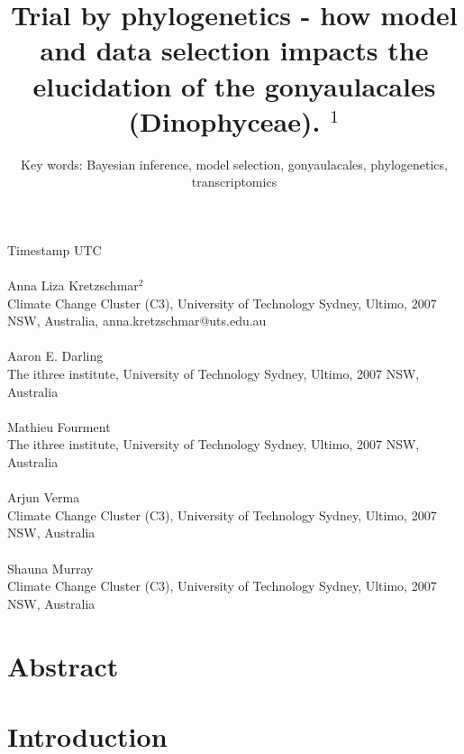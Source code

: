 \documentclass[12pt]{article}
\title{Trial by phylogenetics - how model and data selection impacts the elucidation of the gonyaulacales (Dinophyceae). $^{1}$}
\author{Key words: Bayesian inference, model selection, gonyaulacales, phylogenetics, transcriptomics}
\date{}
\begin{document}
\maketitle

Timestamp \DTMnow UTC

\paragraph{}Anna Liza Kretzschmar$^{2}$\\
Climate Change Cluster (C3), University of Technology Sydney, Ultimo, 2007 NSW, Australia, anna.kretzschmar@uts.edu.au
\paragraph{}Aaron E. Darling \\
The ithree institute, University of Technology Sydney, Ultimo, 2007 NSW, Australia
\paragraph{}Mathieu Fourment \\
The ithree institute, University of Technology Sydney, Ultimo, 2007 NSW, Australia
\paragraph{}Arjun Verma\\
Climate Change Cluster (C3), University of Technology Sydney, Ultimo, 2007 NSW, Australia
\paragraph{}Shauna Murray\\ 
Climate Change Cluster (C3), University of Technology Sydney, Ultimo, 2007 NSW, Australia
\newpage
\section{Abstract}
\newpage

\section{Introduction}

\end{document}
